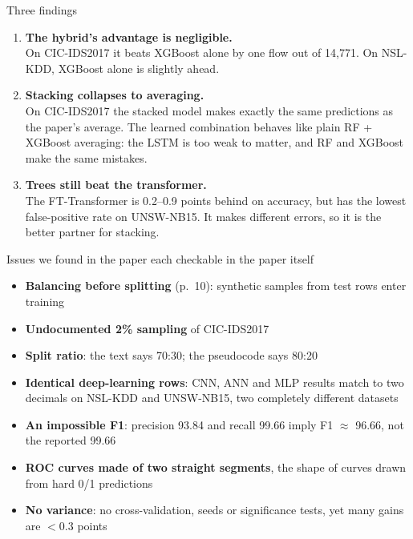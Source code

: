 \documentclass[aspectratio=169,11pt]{beamer}
\begin{document}
\begin{frame}{Three findings}
\begin{enumerate}
  \item \textbf{The hybrid's advantage is negligible.}\\
        \small On CIC-IDS2017 it beats XGBoost alone by \alert{one flow out of 14{,}771}. On NSL-KDD, XGBoost alone is
        slightly ahead.
        \vspace{3mm}
  \item \textbf{Stacking collapses to averaging.}\\
        \small On CIC-IDS2017 the stacked model makes \alert{exactly the same predictions} as the paper's average.
        The learned combination behaves like plain RF + XGBoost averaging: the LSTM is too weak to matter, and RF and XGBoost
        make the same mistakes.
        \vspace{3mm}
  \item \textbf{Trees still beat the transformer.}\\
        \small The FT-Transformer is 0.2--0.9 points behind on accuracy, but has the \alert{lowest false-positive rate}
        on UNSW-NB15. It makes different errors, so it is the better partner for stacking.
\end{enumerate}
\end{frame}

\begin{frame}{Issues we found in the paper \hfill {\normalsize\normalfont each checkable in the paper itself}}
\begin{itemize}\small
  \item \textbf{Balancing before splitting} (p.~10): synthetic samples from test rows enter training
  \item \textbf{Undocumented 2\% sampling} of CIC-IDS2017
  \item \textbf{Split ratio}: the text says 70:30; the pseudocode says 80:20
  \item \textbf{Identical deep-learning rows}: CNN, ANN and MLP results match to two decimals on NSL-KDD and
        UNSW-NB15, two completely different datasets
  \item \textbf{An impossible F1}: precision 93.84 and recall 99.66 imply F1 $\approx$ 96.66, not the reported 99.66
  \item \textbf{ROC curves made of two straight segments}, the shape of curves drawn from hard 0/1 predictions
  \item \textbf{No variance}: no cross-validation, seeds or significance tests, yet many gains are $<$0.3 points
\end{itemize}
\end{frame}
\end{document}
